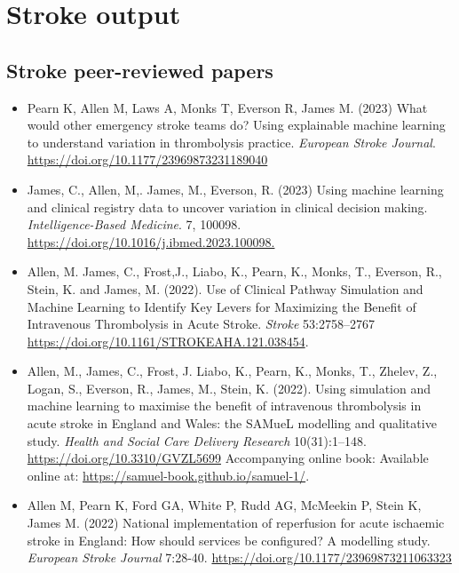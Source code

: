 
\section{Stroke output}

\subsection{Stroke peer-reviewed papers}

\begin{itemize}
    \item Pearn K, Allen M, Laws A, Monks T, Everson R, James M. (2023) What would other emergency stroke teams do? Using explainable machine learning to understand variation in thrombolysis practice. \textit{European Stroke Journal}. \url{https://doi.org/10.1177/23969873231189040}

    \item James, C., Allen, M,. James, M., Everson, R. (2023) Using machine learning and clinical registry data to uncover variation in clinical decision making. \textit{Intelligence-Based Medicine}. 7, 100098.  \url{https://doi.org/10.1016/j.ibmed.2023.100098.}

    \item Allen, M. James, C., Frost,J., Liabo, K., Pearn, K., Monks, T., Everson, R., Stein, K. and James, M.  (2022). Use of Clinical Pathway Simulation and Machine Learning to Identify Key Levers for Maximizing the Benefit of Intravenous Thrombolysis in Acute Stroke.  \textit{Stroke} 53:2758–2767 \url{https://doi.org/10.1161/STROKEAHA.121.038454}. 

    \item Allen, M., James, C., Frost, J. Liabo, K., Pearn, K., Monks, T., Zhelev, Z., Logan, S., Everson, R., James, M., Stein, K. (2022). Using simulation and machine learning to maximise the benefit of intravenous thrombolysis in acute stroke in England and Wales: the SAMueL modelling and qualitative study. \textit{Health and Social Care Delivery Research} 10(31):1–148. \url{https://doi.org/10.3310/GVZL5699} Accompanying online book: Available online at: \url{https://samuel-book.github.io/samuel-1/}.
    
    \item Allen M, Pearn K, Ford GA, White P, Rudd AG, McMeekin P, Stein K, James M. (2022) National implementation of reperfusion for acute ischaemic stroke in England: How should services be configured? A modelling study. \textit{European Stroke Journal} 7:28-40. \url{https://doi.org/10.1177/23969873211063323}


\end{itemize}
